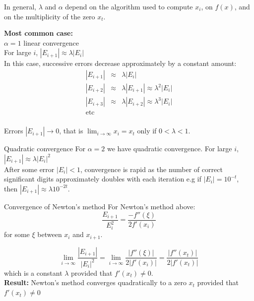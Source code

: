 \documentclass[12pt]{beamer}
\begin{document}
\begin{frame} 
In general, $\lambda$ and $\alpha$ depend on the algorithm used to compute ${x_i}$, on $f(x)$, and on the multiplicity of the zero $x_t$. 


{\bf Most common case:} 
\\ 
$\alpha = 1$ linear convergence \\ 
For large $i$, $|E_{i+1}| \approx \lambda |E_i|$ \\ 


In this case, successive errors decrease approximately by a constant amount: 
\begin{eqnarray*} 
|E_{i+1}| &\approx & \lambda |E_i| \\ 
|E_{i+2}| &\approx &  \lambda |E_{i+1}| \approx \lambda^2 |E_i|\\ 
|E_{i+3}| & \approx &  \lambda |E_{i+2}| \approx \lambda^3 |E_i|\\ 
\mbox{etc} \\ 
\end{eqnarray*} 

Errors $|E_{i+1}| \rightarrow 0$, that is $\lim_{i \rightarrow \infty}
x_i = x_t$ only if $0 < \lambda < 1$.
\end{frame} 

\begin{frame}{Quadratic convergence} 
For $\alpha = 2$ we have quadratic convergence. For large $i$, $|E_{i+1}| \approx \lambda |E_i|^2$ 
\\
After some error $|E_i| < 1$, convergence is rapid as the number of correct significant digits approximately doubles with each iteration e.g if 
$|E_i| = 10^{-t}$, then $|E_{i+1}| \approx \lambda 10^{-2t}$. 
\end{frame} 

\begin{frame}{Convergence of Newton's method} 
For Newton's method above: 
\[ 
\frac{E_{i+1}}{E_{i}^2} = \frac{-f''(\xi)}{2f'(x_i)} 
\] 
\noindent for some $\xi$ between $x_i$ and $x_{i+1}$. 

\[
\lim_{i \rightarrow \infty} \frac{|E_{i+1}|}{|E_i|^2} = \lim_{i \rightarrow \infty} 
\frac{|f''(\xi)|}{2|f'(x_i)|} = \frac{|f''(x_t)|}{2|f'(x_t)|}
\]
\noindent 
which is a constant $\lambda$ provided that $f'(x_t) \neq 0$. 
\\
{\bf Result:} Newton's method converges quadratically to a zero $x_t$ provided that $f'(x_t) \neq 0$
\end{frame} 
\end{document}
